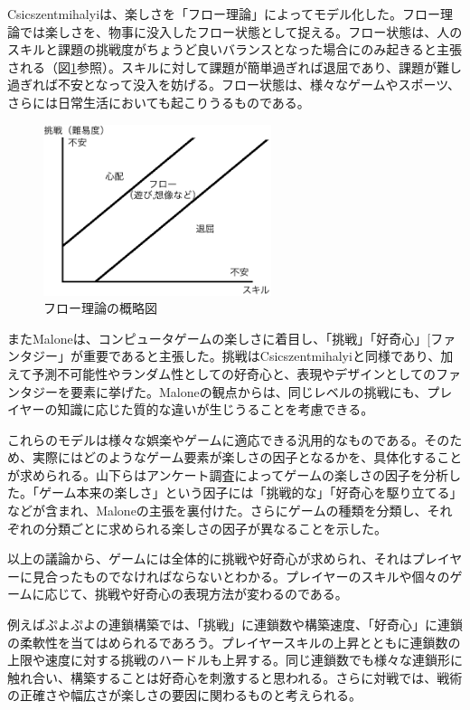 \documentclass[12pt]{jarticle}
\begin{document}
Csicszentmihalyi\cite{csikszentmihalyi}は、楽しさを「フロー理論」によってモデル化した。フロー理論では楽しさを、物事に没入したフロー状態として捉える。フロー状態は、人のスキルと課題の挑戦度がちょうど良いバランスとなった場合にのみ起きると主張される（図\ref{fig:flow}参照）。スキルに対して課題が簡単過ぎれば退屈であり、課題が難し過ぎれば不安となって没入を妨げる。フロー状態は、様々なゲームやスポーツ、さらには日常生活においても起こりうるものである。

\begin{figure}[hbt]
  \begin{center}
  \includegraphics[height=5cm]{img/flow_theory.png}
  \caption{フロー理論の概略図} \label{fig:flow}
\end{center}
\end{figure}

またMalone\cite{malone}は、コンピュータゲームの楽しさに着目し、「挑戦」「好奇心」[ファンタジー」が重要であると主張した。挑戦はCsicszentmihalyiと同様であり、加えて予測不可能性やランダム性としての好奇心と、表現やデザインとしてのファンタジーを要素に挙げた。Maloneの観点からは、同じレベルの挑戦にも、プレイヤーの知識に応じた質的な違いが生じうることを考慮できる。

これらのモデルは様々な娯楽やゲームに適応できる汎用的なものである。そのため、実際にはどのようなゲーム要素が楽しさの因子となるかを、具体化することが求められる。山下ら\cite{tanosisa}はアンケート調査によってゲームの楽しさの因子を分析した。「ゲーム本来の楽しさ」という因子には「挑戦的な」「好奇心を駆り立てる」などが含まれ、Maloneの主張を裏付けた。さらにゲームの種類を分類し、それぞれの分類ごとに求められる楽しさの因子が異なることを示した。

以上の議論から、ゲームには全体的に挑戦や好奇心が求められ、それはプレイヤーに見合ったものでなければならないとわかる。プレイヤーのスキルや個々のゲームに応じて、挑戦や好奇心の表現方法が変わるのである。

例えばぷよぷよの連鎖構築では、「挑戦」に連鎖数や構築速度、「好奇心」に連鎖の柔軟性を当てはめられるであろう。プレイヤースキルの上昇とともに連鎖数の上限や速度に対する挑戦のハードルも上昇する。同じ連鎖数でも様々な連鎖形に触れ合い、構築することは好奇心を刺激すると思われる。さらに対戦では、戦術の正確さや幅広さが楽しさの要因に関わるものと考えられる。
\end{document}
